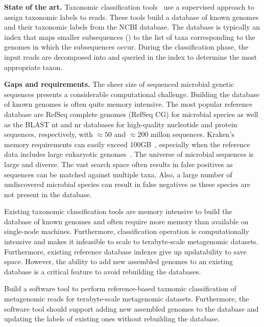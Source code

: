\noindent
{\bf State of the art.}
Taxonomic classification tools~\cite{ames2013scalable, kim2016centrifuge, menzel2016fast, wood2014kraken, wood2019improved, dilthey2019strain,liu2018novel} use a supervised approach to assign taxonomic labels to reads.
These tools build a database of known genomes and their taxonomic labels from the NCBI database.
The database is typically an index that maps smaller subsequences (\kmers) to the list of taxa corresponding to the genomes in which the subsequences occur.
During the classification phase, the input reads are decomposed into \kmers and queried in the index to determine the most appropriate taxon.

\noindent
{\bf Gaps and requirements.}
The sheer size of sequenced microbial genetic sequences presents a considerable computational challenge.
Building the database of known genomes is often quite memory intensive.
The most popular reference database are RefSeq complete genomes (RefSeq CG) for microbial species as well as the BLAST nt and nr databases for high-quality nucleotide and protein sequences, respectively, with $\approx50$ and $\approx200$ millon sequences.
Kraken's~\cite{wood2014kraken} memory requirements can easily exceed 100GB~\cite{simon2019benchmarking}, especially when the reference data includes large eukaryotic genomes~\cite{meiser2017sequencing, knutson2017porcine}.
%
The universe of microbial sequences is large and diverse. The vast search space often results in false positives as sequences can be matched against multiple taxa. Also, a large number of undiscovered microbial species can result in false negatives as these species are not present in the database.

Existing taxonomic classification tools are memory intensive to build the database of known genomes and often require more memory than available on single-node machines. Furthermore, classification operation is computationally intensive and makes it infeasible to scale to terabyte-scale metagenomic datasets.
%
Furthermore, existing reference database indexes give up updatability to save space. However, the ability to add new assembled genomes to an existing database is a critical feature to avoid rebuilding the databases. 


\begin{rproblem}
Build a software tool to perform reference-based taxnomic classification of metagenomic reads for terabyte-scale metagenomic datasets. Furthermore, the software tool should support adding new assembled genomes to the database and updating the labels of existing ones without rebuilding the database.
\label{rprob:peppermint1}
\end{rproblem}

